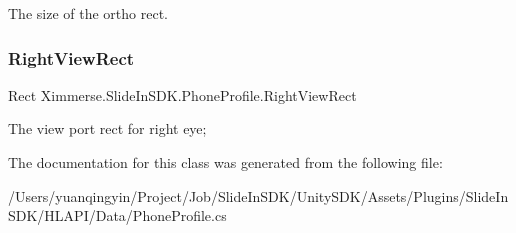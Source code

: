 The size of the ortho rect.\mbox{\label{class_ximmerse_1_1_slide_in_s_d_k_1_1_phone_profile_abab72ac8909ed9abcd993f003806d21c}} 
\subsubsection{\texorpdfstring{Right\+View\+Rect}{RightViewRect}}
{\footnotesize\ttfamily Rect Ximmerse.\+Slide\+In\+S\+D\+K.\+Phone\+Profile.\+Right\+View\+Rect\hspace{0.3cm}{\ttfamily [get]}}



The view port rect for right eye; 



The documentation for this class was generated from the following file\+:\begin{DoxyCompactItemize}
\item 
/\+Users/yuanqingyin/\+Project/\+Job/\+Slide\+In\+S\+D\+K/\+Unity\+S\+D\+K/\+Assets/\+Plugins/\+Slide\+In\+S\+D\+K/\+H\+L\+A\+P\+I/\+Data/Phone\+Profile.\+cs\end{DoxyCompactItemize}
